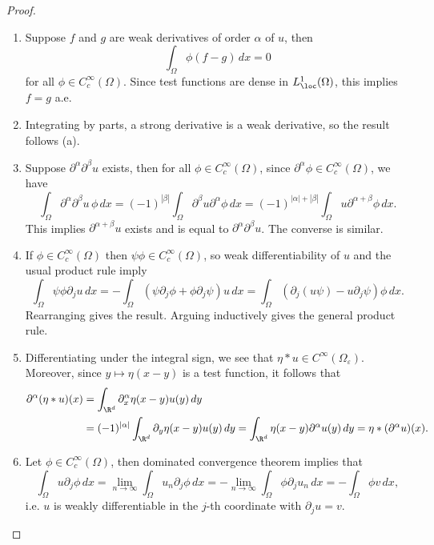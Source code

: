 \documentclass[reqno]{amsart}
\theoremstyle{definition}
\theoremstyle{remark}
\renewcommand{\epsilon}{\varepsilon}
\begin{document}
\begin{proof}
\leavevmode
\begin{enumerate}
	\item Suppose $f$ and $g$ are weak derivatives of order $\alpha$ of $u$, then 
				\[ \int_\Omega \phi (f - g) \, dx = 0 \]
			for all $\phi \in C^\infty_c (\Omega)$. Since test functions are dense in $L^1_\loc (\Omega)$, this implies $f = g$ a.e. 
			
	\item Integrating by parts, a strong derivative is a weak derivative, so the result follows (a). 
	
	\item Suppose $\partial^\alpha \partial^\beta u$ exists, then for all $\phi \in C^\infty_c (\Omega)$, since $\partial^\alpha \phi \in C^\infty_c (\Omega)$, we have
				\[ \int_\Omega \partial^\alpha \partial^\beta u \, \phi \, dx  = (-1)^{|\beta|} \int_\Omega \partial^\beta u \partial^\alpha \phi \, dx = (-1)^{|\alpha| + |\beta|} \int_\Omega u \partial^{\alpha + \beta} \phi \, dx. \]
			This implies $\partial^{\alpha + \beta} u$ exists and is equal to $\partial^\alpha \partial^\beta u$. The converse is similar. 
			
	\item If $\phi \in C^\infty_c (\Omega)$ then $\psi \phi \in C^\infty_c (\Omega)$, so weak differentiability of $u$ and the usual product rule imply
				\[ \int_\Omega \psi \phi \partial_j u \, dx = - \int_\Omega (\psi \partial_j \phi + \phi \partial_j \psi) u \, dx = \int_\Omega (\partial_j(u \psi) - u \partial_j \psi) \phi \, dx. \]
			Rearranging gives the result. Arguing inductively gives the general product rule. 
	\item Differentiating under the integral sign, we see that $\eta * u \in C^\infty (\Omega_\epsilon)$. Moreover, since $y \mapsto \eta(x - y)$ is a test function, it follows that 
				\begin{align*}
					\partial^\alpha (\eta * u) (x) 
						&= \int_{\R^d} \partial^\alpha_x \eta(x - y) u(y) \, dy \\
						&= (-1)^{|\alpha|} \int_{\R^d} \partial_y \eta (x - y) u(y) \, dy = \int_{\R^d} \eta(x - y) \partial^\alpha u(y) \, dy = \eta * (\partial^\alpha u) (x) .
				\end{align*}	
	\item Let $\phi \in C^\infty_c (\Omega)$, then dominated convergence theorem implies that 
		\[ \int_\Omega u \partial_j \phi \, dx = \lim_{n \to \infty} \int_\Omega u_n \partial_j \phi \, dx = - \lim_{n \to \infty} \int_\Omega \phi \partial_j u_n \, dx = - \int_\Omega \phi v \, dx, \]
	i.e. $u$ is weakly differentiable in the $j$-th coordinate with $\partial_j u = v$. 				
\end{enumerate}
\end{proof}
\end{document}
